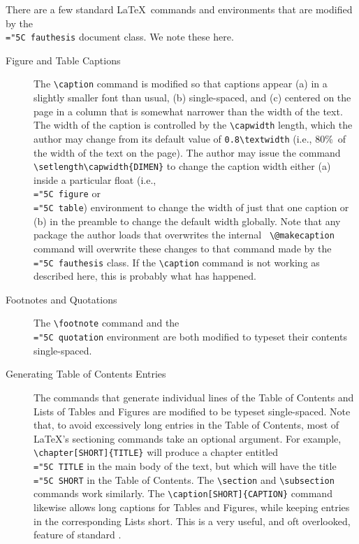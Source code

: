 \documentclass[11pt]{article}
\newcommand\code[1]{{\normalfont\texttt{\let\dv\textsl\chardef\\="5C #1}}}
\begin{document}
There are a few standard \LaTeX\ commands and environments that are modified by the \code{fauthesis} document class.  We note these here.
%
\begin{description}

\item[Figure and Table Captions]
The \verb=\caption= command is modified so that captions appear (a) in a slightly smaller font than usual, (b) single-spaced, and (c) centered on the page in a column that is somewhat narrower than the width of the text.  The width of the caption is controlled by the \verb=\capwidth= length, which the author may change from its default value of \verb=0.8\textwidth= (i.e., 80\%\ of the width of the text on the page).  The author may issue the command \verb=\setlength\capwidth{DIMEN}= to change the caption width either (a) inside a particular float (i.e., \code{figure} or \code{table}) environment to change the width of just that one caption or (b) in the preamble to change the default width globally.  Note that any package the author loads that overwrites the internal \LaTeXe\ \verb=\@makecaption= command will overwrite these changes to that command made by the \code{fauthesis} class.  If the \verb=\caption= command is not working as described here, this is probably what has happened.

\item[Footnotes and Quotations]
The \verb=\footnote= command and the \code{quotation} environment are both modified to typeset their contents single-spaced.

\item[Generating Table of Contents Entries]
The commands that generate individual lines of the Table of Contents and Lists of Tables and Figures are modified to be typeset single-spaced.  Note that, to avoid excessively long entries in the Table of Contents, most of \LaTeX's sectioning commands take an optional argument.  For example, \verb=\chapter[SHORT]{TITLE}= will produce a chapter entitled \code{TITLE} in the main body of the text, but which will have the title \code{SHORT} in the Table of Contents.  The \verb=\section= and \verb=\subsection= commands work similarly.  The \verb=\caption[SHORT]{CAPTION}= command likewise allows long captions for Tables and Figures, while keeping entries in the corresponding Lists short.  This is a very useful, and oft overlooked, feature of standard \LaTeXe.


\end{description}
\end{document}
